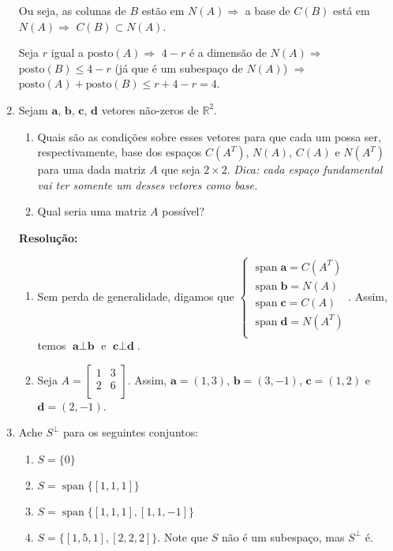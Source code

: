 \documentclass[leqno]{article}
\DeclareMathOperator{\spn}{span}
\newcommand{\pst}[1]{\text{posto}(#1)}
\begin{document}
\begin{enumerate}
    Ou seja, as colunas de $B$ estão em $N(A)\Rightarrow$ a base de $C(B)$ está em $N(A)\Rightarrow$ $C(B)\subset N(A)$.
    
    Seja $r$ igual a $\pst{A}\Rightarrow$ $4-r$ é a dimensão de $N(A)\Rightarrow$ $\pst{B}\leq 4-r$ (já que é um subespaço de $N(A)$) $\Rightarrow$ $\pst{A}+\pst{B}\leq r+4-r=4$.
    
    \item Sejam $\textbf{a}$, $\textbf{b}$, $\textbf{c}$, $\textbf{d}$ vetores não-zeros de $\mathbb{R}^2$.
    
    \begin{enumerate}
        \item Quais são as condições sobre esses vetores para que cada um possa ser, respectivamente, base dos espaços $C(A^T)$, $N(A)$, $C(A)$ e $N(A^T)$ para uma dada matriz $A$ que seja $2\times2$. \textit{Dica: cada espaço fundamental vai ter somente um desses vetores como base.}
        
        \item Qual seria uma matriz $A$ possível?
    \end{enumerate}
    
    \textbf{Resolução:}
    
    \begin{enumerate}
        \item Sem perda de generalidade, digamos que $\begin{cases}
            \spn{\textbf{a}}=C(A^T)\\
            \spn{\textbf{b}}=N(A)\\
            \spn{\textbf{c}}=C(A)\\
            \spn{\textbf{d}}=N(A^T)\\
        \end{cases}$. Assim, temos $\textbf{a}\perp \textbf{b}$ e $\textbf{c}\perp\textbf{d}$.
        
        \item Seja $A=\begin{bmatrix}1 & 3\\2 & 6\\\end{bmatrix}$. Assim, $\textbf{a}=(1,3)$, $\textbf{b}=(3,-1)$, $\textbf{c}=(1,2)$ e $\textbf{d}=(2,-1)$.
    \end{enumerate}
    
    \item Ache $S^{\perp}$ para os seguintes conjuntos:
    
    \begin{enumerate}
        \item $S=\{0\}$
        \item $S=\spn{\{[1,1,1]\}}$
        \item $S=\spn{\{[1,1,1],[1,1,-1]\}}$
        \item $S=\{[1,5,1],[2,2,2]\}$. Note que $S$ não é um subespaço, mas $S^{\perp}$ é.
    \end{enumerate}
    

\end{enumerate}
\end{document}
